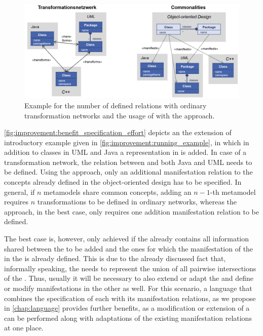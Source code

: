 \begin{figure}
    \centering
    \includegraphics[width=\textwidth]{figures/quality/improvement/benefit_specification_effort.png}
    \caption[Benefit of \commonalities regarding specification effort]{Example for the number of defined relations with ordinary transformation networks and the usage of \conceptmetamodels with the \commonalities approach.} %
    \label{fig:improvement:benefit_specification_effort}
\end{figure}

\autoref{fig:improvement:benefit_specification_effort} depicts an the extension of introductory example given in \autoref{fig:improvement:running_example}, in which in addition to classes in \gls{UML} and Java a representation in \cplusplus is added.
In case of a transformation network, the relation between \cplusplus and both Java and \gls{UML} needs to be defined.
Using the \commonalities approach, only an additional manifestation relation to the concepts already defined in the object-oriented design \conceptmetamodels has to be specified.
In general, if $n$ metamodels share common concepts, adding an $n-1$-th metamodel requires $n$ transformations to be defined in ordinary networks, whereas the \commonalities approach, in the best case, only requires one addition manifestation relation to be defined.

The best case is, however, only achieved if the \conceptmetamodel already contains all information shared between the \concretemetamodel to be added and the ones for which the manifestation of the \commonalities in the \conceptmetamodel is already defined.
This is due to the already discussed fact that, informally speaking, the \conceptmetamodel needs to represent the union of all pairwise intersections of the \concretemetamodels.
Thus, usually it will be necessary to also extend or adapt the \conceptmetamodel and define or modify manifestations in the other \concretemetamodels as well.
For this scenario, a language that combines the specification of each \commonality with its manifestation relations, as we propose in \autoref{chap:language} provides further benefits, as a modification or extension of a \commonality can be performed along with adaptations of the existing manifestation relations at one place.

